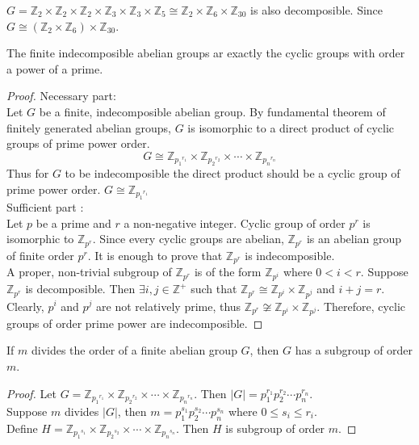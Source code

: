 \begin{remark}
	$G = \mathbb{Z}_2 \times \mathbb{Z}_2 \times \mathbb{Z}_2 \times \mathbb{Z}_{3} \times \mathbb{Z}_3 \times \mathbb{Z}_5 \cong \mathbb{Z}_2 \times \mathbb{Z}_{6} \times \mathbb{Z}_{30}$ is also decomposible. Since $G \cong (\mathbb{Z}_2 \times \mathbb{Z}_{6}) \times \mathbb{Z}_{30}$.
\end{remark}

\begin{theorem}
	The finite indecomposible abelian groups ar exactly the cyclic groups with order a power of a prime.
\end{theorem}
\begin{proof}
	Necessary part: \\
	Let $G$ be a finite, indecomposible abelian group. By fundamental theorem of finitely generated abelian groups, $G$ is isomorphic to a direct product of cyclic groups of prime power order.
	$$ G \cong \mathbb{Z}_{{p_1}^{r_1}} \times \mathbb{Z}_{{p_2}^{r_2}} \times \cdots \times \mathbb{Z}_{{p_n}^{r_n}}$$
	Thus for $G$ to be indecomposible the direct product should be a cyclic group of prime power order. $G \cong \mathbb{Z}_{{p_1}^{r_1}}$\\

	Sufficient part : \\
	Let $p$ be a prime and $r$ a non-negative integer. Cyclic group of order $p^r$ is isomorphic to $\mathbb{Z}_{p^r}$. Since every cyclic groups are abelian, $\mathbb{Z}_{p^r}$ is an abelian group of finite order $p^r$. It is enough to prove that $\mathbb{Z}_{p^r}$ is indecomposible.\\

	A proper, non-trivial subgroup of $\mathbb{Z}_{p^r}$ is of the form $\mathbb{Z}_{p^i}$ where $0 < i < r$.
	Suppose $\mathbb{Z}_{p^r}$ is decomposible. Then $\exists i,j \in \mathbb{Z}^+$ such that $\mathbb{Z}_{p^r} \cong \mathbb{Z}_{p^i} \times \mathbb{Z}_{p^j}$ and $i+j=r$. Clearly, $p^i$ and $p^j$ are not relatively prime, thus $\mathbb{Z}_{p^r} \not\cong \mathbb{Z}_{p^i} \times \mathbb{Z}_{p^j}$. Therefore, cyclic groups of order prime power are indecomposible.
\end{proof}

\begin{theorem}
	If $m$ divides the order of a finite abelian group $G$, then $G$ has a subgroup of order $m$.
\end{theorem}
\begin{proof}
	Let $G = \mathbb{Z}_{{p_1}^{r_1}} \times \mathbb{Z}_{{p_2}^{r_2}} \times \cdots \times \mathbb{Z}_{{p_n}^{r_n}}$.
	Then $|G| = p_1^{r_1} p_2^{r_2} \cdots p_n^{r_n}$.\\
	Suppose $m$ divides $|G|$, then $m = p_1^{s_1} p_2^{s_2} \cdots p_n^{s_n}$ where $0 \le s_i \le r_i$. \\
	Define $H = \mathbb{Z}_{{p_1}^{s_1}} \times \mathbb{Z}_{{p_2}^{s_2}} \times \cdots \times \mathbb{Z}_{{p_n}^{s_n}}$. Then $H$ is subgroup of order $m$.
\end{proof}

